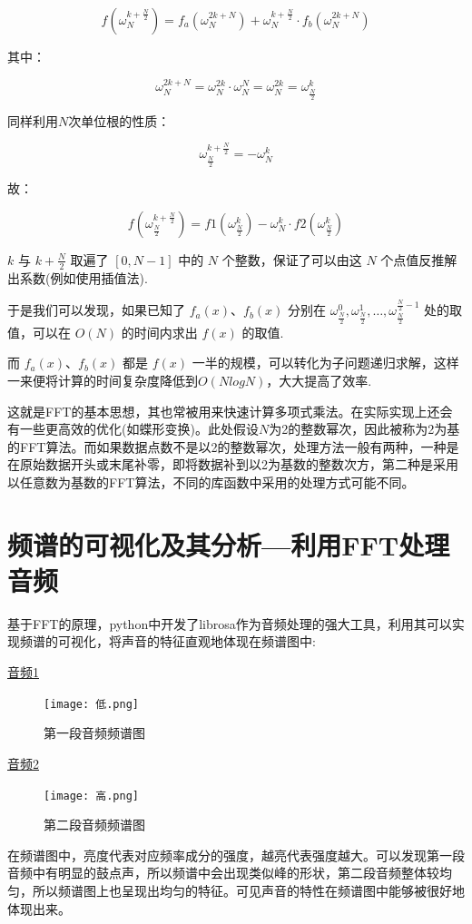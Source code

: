 \documentclass[11pt,a4paper]{ctexart}
\begin{document}
	\[ f\left(\omega_{N}^{k+\frac{N}{2}}\right) = f_a\left(\omega_{N}^{2k + N}\right) + \omega_{N}^{k+\frac{N}{2}} \cdot f_b\left(\omega_{N}^{2k + N}\right) \]
	
	其中：
	
	\[ \omega_{N}^{2k + N} = \omega_{N}^{2k} \cdot \omega_{N}^{N} = \omega_{N}^{2k} = \omega_{\frac{N}{2}}^{k} \]
	
	同样利用$N$次单位根的性质：
	
	\[ \omega_{\frac{N}{2}}^{k+\frac{N}{2}} = -\omega_{N}^{k} \]
	
	故：
	
	\[ f\left(\omega_{\frac{N}{2}}^{k+\frac{N}{2}}\right) = f1\left(\omega_{\frac{N}{2}}^{k}\right) - \omega_{N}^{k} \cdot f2\left(\omega_{\frac{N}{2}}^{k}\right) \]
	
	\(k\) 与 \(k + \frac{N}{2}\) 取遍了 \([0, N-1]\) 中的 \(N\) 个整数，保证了可以由这 \(N\) 个点值反推解出系数(例如使用插值法).
	
	于是我们可以发现，如果已知了 \(f_a(x)\)、\(f_b(x)\) 分别在 \(\omega_{\frac{N}{2}}^{0}, \omega_{\frac{N}{2}}^{1}, \ldots, \omega_{\frac{N}{2}}^{\frac{N}{2}-1}\) 处的取值，可以在 \(O(N)\) 的时间内求出 \(f(x)\) 的取值.
	
	而 \(f_a(x)\)、\(f_b(x)\) 都是 \(f(x)\) 一半的规模，可以转化为子问题递归求解，这样一来便将计算的时间复杂度降低到$O(NlogN)$，大大提高了效率.
	
	这就是FFT的基本思想，其也常被用来快速计算多项式乘法。在实际实现上还会有一些更高效的优化(如蝶形变换)。此处假设$N$为2的整数幂次，因此被称为2为基的FFT算法。而如果数据点数不是以2的整数幂次，处理方法一般有两种，一种是在原始数据开头或末尾补零，即将数据补到以2为基数的整数次方，第二种是采用以任意数为基数的FFT算法，不同的库函数中采用的处理方式可能不同。
	\section{频谱的可视化及其分析---利用FFT处理音频}
	基于FFT的原理，python中开发了librosa作为音频处理的强大工具，利用其可以实现频谱的可视化，将声音的特征直观地体现在频谱图中:
	
	
	\href{run:低.wav}{音频1}
	\begin{figure}[h]
		\centering
		\texttt{[image: 低.png]} %
		\caption{第一段音频频谱图} %
	\end{figure}
	\FloatBarrier
		\href{run:高.wav}{音频2}
	\begin{figure}[h]
		\centering
		\texttt{[image: 高.png]} %
		\caption{第二段音频频谱图} %
	\end{figure}
	\FloatBarrier
	在频谱图中，亮度代表对应频率成分的强度，越亮代表强度越大。可以发现第一段音频中有明显的鼓点声，所以频谱中会出现类似峰的形状，第二段音频整体较均匀，所以频谱图上也呈现出均匀的特征。可见声音的特性在频谱图中能够被很好地体现出来。
	
\end{document}
